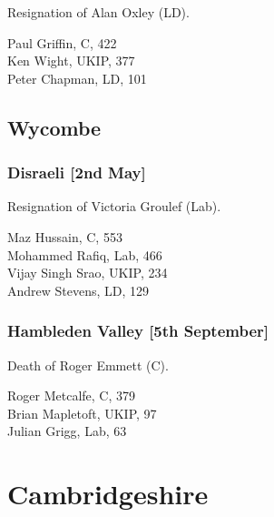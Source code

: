 \documentclass[a4paper,openany,10pt]{book}
\begin{document}
Resignation of Alan Oxley (LD).



Paul Griffin, C, 422\\
Ken Wight, UKIP, 377\\
Peter Chapman, LD, 101\\


\subsection*{Wycombe}

\subsubsection*{Disraeli \hspace*{\fill}\nolinebreak[1]%
\enspace\hspace*{\fill}
[2nd May]}


Resignation of Victoria Groulef (Lab).



Maz Hussain, C, 553\\
Mohammed Rafiq, Lab, 466\\
Vijay Singh Srao, UKIP, 234\\
Andrew Stevens, LD, 129\\


\subsubsection*{Hambleden Valley \hspace*{\fill}\nolinebreak[1]%
\enspace\hspace*{\fill}
[5th September]}


Death of Roger Emmett (C).



Roger Metcalfe, C, 379\\
Brian Mapletoft, UKIP, 97\\
Julian Grigg, Lab, 63\\


\vfill

\section[Cambridgeshire]{{Cambridgeshire}}
\end{document}
